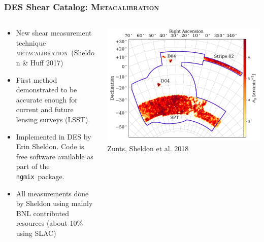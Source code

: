 \documentclass[aspectratio=169]{beamer}
\newcommand{\mcal}{\textsc{metacalibration}}
\newcommand{\Mcal}{\textsc{Metacalibration}}
\newcommand{\ngmix}{\texttt{ngmix}}
\begin{document}
\frame
{

    \frametitle{DES Shear Catalog: \Mcal}


    \begin{columns}
        \begin{column}{0.5\textwidth}
            \begin{itemize}

                \item New shear measurement technique \mcal\ (Sheldon \& Huff
                    2017)

                \item First method demonstrated to be accurate enough for
                    current and future lensing surveys (LSST).

                \item Implemented in DES by Erin Sheldon.  Code 
                    is free software available as part of the \ngmix\ package.

                \item All measurements done by Sheldon using mainly BNL contributed
                    resources (about 10\% using SLAC)

            \end{itemize}

        \end{column}
        \begin{column}{0.5\textwidth}
            \centering
                \includegraphics[width=\linewidth]{shearcat-fig2.png}
                \newline
                {\tiny Zunts, Sheldon et al. 2018}
        \end{column}

    \end{columns}

}
\end{document}
